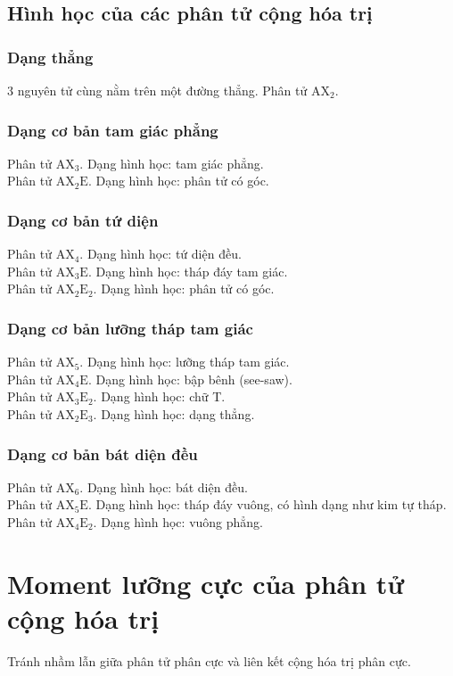 \subsection{Hình học của các phân tử cộng hóa trị}
\subsubsection{Dạng thẳng}
$3$ nguyên tử cùng nằm trên một đường thẳng. Phân tử $\mathrm{AX_2}.$
\subsubsection{Dạng cơ bản tam giác phẳng}
Phân tử $\mathrm{AX_3}.$ Dạng hình học: tam giác phẳng.\\
Phân tử $\mathrm{AX_2 E}.$ Dạng hình học: phân tử có góc.
\subsubsection{Dạng cơ bản tứ diện}
Phân tử $\mathrm{AX_4}.$ Dạng hình học: tứ diện đều.\\
Phân tử $\mathrm{AX_3 E}.$ Dạng hình học: tháp đáy tam giác.\\
Phân tử $\mathrm{AX_2 E_2}.$ Dạng hình học: phân tử có góc.
\subsubsection{Dạng cơ bản lưỡng tháp tam giác}
Phân tử $\mathrm{AX_5}.$ Dạng hình học: lưỡng tháp tam giác.\\
Phân tử $\mathrm{AX_4 E}.$ Dạng hình học: bập bênh (see-saw).\\
Phân tử $\mathrm{AX_3 E_2}.$ Dạng hình học: chữ T.\\
Phân tử $\mathrm{AX_2 E_3}.$ Dạng hình học: dạng thẳng.
\subsubsection{Dạng cơ bản bát diện đều}
Phân tử $\mathrm{AX_6}.$ Dạng hình học: bát diện đều.\\
Phân tử $\mathrm{AX_5 E}.$ Dạng hình học: tháp đáy vuông, có hình dạng như kim tự tháp.\\
Phân tử $\mathrm{AX_4 E_2}.$ Dạng hình học: vuông phẳng.
\section{Moment lưỡng cực của phân tử cộng hóa trị}
Tránh nhầm lẫn giữa phân tử phân cực và liên kết cộng hóa trị phân cực.